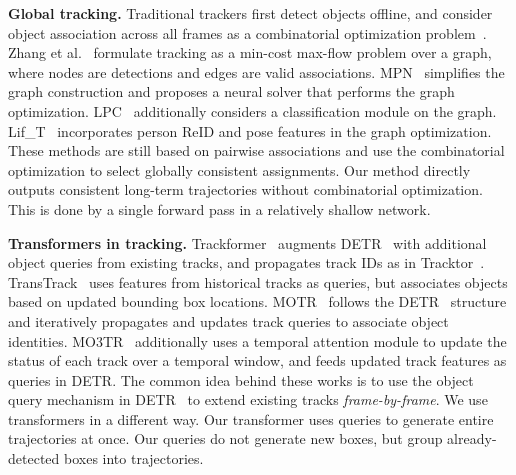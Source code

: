 \documentclass[10pt,twocolumn,letterpaper]{article}
\renewcommand{\paragraph}[1]{\noindent\textbf{#1}}
\begin{document}
\paragraph{Global tracking.}
Traditional trackers first detect objects offline, and consider object association across all frames as a combinatorial optimization problem~\cite{peng2020tpm,zhang2008global,braso2020learning,dai2021learning,tang2017multiple}.
Zhang et al.~\cite{zhang2008global} formulate tracking as a min-cost max-flow problem over a graph, where nodes are detections and edges are valid associations.
MPN~\cite{braso2020learning} simplifies the graph construction and proposes a neural solver that performs the graph optimization.
LPC~\cite{dai2021learning} additionally considers a classification module on the graph.
Lif\_T~\cite{tang2017multiple} incorporates person ReID and pose features in the graph optimization.
These methods are still based on pairwise associations and use the combinatorial optimization to select globally consistent 
assignments.
Our method directly outputs consistent long-term trajectories without combinatorial optimization.
This is done by a single forward pass in a relatively shallow network.


\paragraph{Transformers in tracking.}
Trackformer~\cite{meinhardt2021trackformer} augments DETR~\cite{carion2020end} with additional object queries from existing tracks,
and propagates track IDs as in Tracktor~\cite{bergmann2019tracking}.
TransTrack~\cite{transtrack} uses features from historical tracks as queries, but associates objects based on updated bounding box locations.
MOTR~\cite{zeng2021motr} follows the DETR~\cite{carion2020end} structure and iteratively propagates and updates track queries to associate object identities.
MO3TR~\cite{zhu2021looking} additionally uses a temporal attention module to update the status of each track over a temporal window, and feeds updated track features as queries in DETR.
The common idea behind these works is to use the object query mechanism in DETR~\cite{carion2020end} to extend existing tracks \emph{frame-by-frame}.
We use transformers in a different way.
Our transformer uses queries to generate entire trajectories at once.
Our queries do not generate new boxes, but group already-detected boxes into trajectories.
\end{document}
